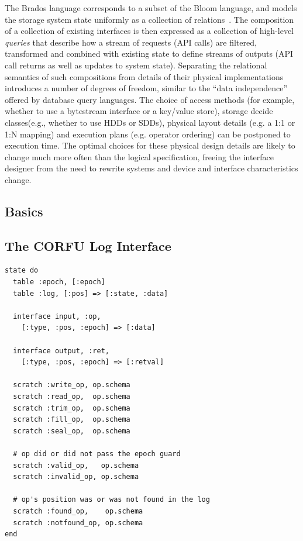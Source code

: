 \documentclass[10pt,twocolumn]{article}
\begin{document}
The Brados language corresponds to a subset of the Bloom language, and models the
storage system state uniformly as a collection of
relations~\cite{alvaro:cidr11}. The composition of a collection of existing
interfaces is then expressed as a collection of high-level \emph{queries} that
describe how a stream of requests (API calls) are filtered, transformed and
combined with existing state to define streams of outputs (API call returns as
well as updates to system state).  Separating the relational semantics of such
compositions from details of their physical implementations introduces a
number of degrees of freedom, similar to the ``data independence'' offered by
database query languages.  The choice of access methods (for example, whether
to use a bytestream interface or a key/value store), storage decide
classes(e.g., whether to use HDDs or SDDs), physical layout details (e.g. a
1:1 or 1:N mapping) and execution plans (e.g.  operator ordering) can be
postponed to execution time.  The optimal choices for these physical design
details are likely to change much more often than the logical specification,
freeing the interface designer from the need to rewrite systems and device and
interface characteristics change.  

\subsection{Basics}

\subsection{The CORFU Log Interface}

\begin{lstlisting}[caption={State Declaration}, label=lst:state]
state do
  table :epoch, [:epoch]
  table :log, [:pos] => [:state, :data]

  interface input, :op,
    [:type, :pos, :epoch] => [:data]

  interface output, :ret,
    [:type, :pos, :epoch] => [:retval]

  scratch :write_op, op.schema
  scratch :read_op,  op.schema
  scratch :trim_op,  op.schema
  scratch :fill_op,  op.schema
  scratch :seal_op,  op.schema

  # op did or did not pass the epoch guard
  scratch :valid_op,   op.schema
  scratch :invalid_op, op.schema

  # op's position was or was not found in the log
  scratch :found_op,    op.schema
  scratch :notfound_op, op.schema
end
\end{lstlisting}
\end{document}
